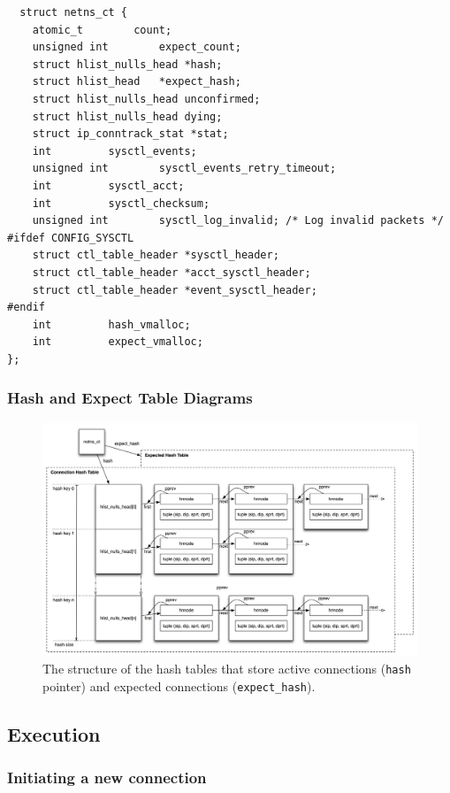 \documentclass[a4paper,10pt]{article}
\newcommand{\code}[1]{\texttt{{#1}}}
\begin{document}
\begin{lstlisting}
  struct netns_ct {
	atomic_t		count;
	unsigned int		expect_count;
	struct hlist_nulls_head	*hash;
	struct hlist_head	*expect_hash;
	struct hlist_nulls_head	unconfirmed;
	struct hlist_nulls_head	dying;
	struct ip_conntrack_stat *stat;
	int			sysctl_events;
	unsigned int		sysctl_events_retry_timeout;
	int			sysctl_acct;
	int			sysctl_checksum;
	unsigned int		sysctl_log_invalid; /* Log invalid packets */
#ifdef CONFIG_SYSCTL
	struct ctl_table_header	*sysctl_header;
	struct ctl_table_header	*acct_sysctl_header;
	struct ctl_table_header	*event_sysctl_header;
#endif
	int			hash_vmalloc;
	int			expect_vmalloc;
};
\end{lstlisting}

\subsubsection{Hash and Expect Table Diagrams}


\begin{figure}[H]
  \centering
  \includegraphics[totalheight=0.45\textheight]{images/hash_expect_tables.png}
  \caption{The structure of the hash tables that store active
    connections (\code{hash} pointer) and expected connections
    (\code{expect\_hash}).}\label{fig:hash}
\end{figure}

\subsection{Execution}

\subsubsection{Initiating a new connection}
\end{document}
